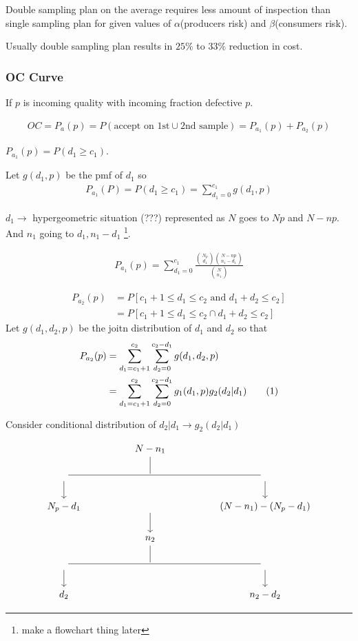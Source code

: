 \documentclass[oneside,11pt,pdftex]{book}%
\numberwithin{equation}{section}
\newcommand\numberthis{\addtocounter{equation}{1}\tag{\theequation}}
\numberwithin{section}{chapter}
\numberwithin{equation}{chapter}
\begin{document}
Double sampling plan on the average requires less amount of inspection than single sampling plan for given values of $ \alpha $(producers risk) and $ \beta  $(consumers risk).

Usually double sampling plan results in $ 25\% $ to $ 33\% $ reduction in cost.

\subsubsection{OC Curve}
If $ p $ is incoming quality with incoming fraction defective $ p $. 

\begin{align}
	OC=P_a(p) = P(\text{accept on 1st} \cup \text{2nd sample})=P_{a_1}(p)+P_{a_2}(p)
\end{align}

$ P_{a_1}(p)=P(d_1\geq c_1) $. 

Let $ g(d_1,p) $ be the pmf of $ d_1 $ so  
\begin{align}
	P_{a_1} (P)=P(d_1\geq c_1)=\sum_{d_1=0}^{c_1}g(d_1,p)
\end{align}

$ d_1 \rightarrow  $ hypergeometric situation (???) represented as $ N $ goes to $ Np $ and $ N-np $. And $ n_1 $ going to $ d_1, n_1-d_1 $ \footnote{make a flowchart thing later}.

\begin{align} 
	P_{a_1} (p)= \sum_{d_1=0}^{c_1} \frac{\binom{N_p}{d_1}\binom{N-np}{n_1-d_1}}{\binom{N}{n_1}}
\end{align}

\begin{align*}
	P_{a_2}(p)&=P[c_1+1\leq d_1 \leq c_2 \text{ and } d_1+d_2 \leq c_2]\\
	&=P[c_1+1\leq d_1 \leq c_2 \cap d_1+d_2 \leq c_2]
\end{align*}
Let $ g(d_1,d_2,p) $ be the joitn distribution of $ d_1 $ and $ d_2 $ so that 
\begin{align*}
	P_{a_2}(p)&= \sum_{d_1=c_1+1}^{c_2} \sum_{d_2=0}^{c_2-d_1}g(d_1,d_2,p)\\
	&=\sum_{d_1=c_1+1}^{c_2} \sum_{d_2=0}^{c_2-d_1} g_1(d_1,p)g_2(d_2| d_1) \numberthis
\end{align*}

Consider conditional distribution of $ d_2|d_1 \to g_2(d_2|d_1)  $

\[\begin{tikzcd}
	&& {N-n_1} \\
	{} && {} && {} \\
	{N_p-d_1} && {} && {(N-n_1)-(N_p-d_1)} \\
	&& {n_2} \\
	{} && {} && {} \\
	{d_2} &&&& {n_2-d_2}
	\arrow[from=2-5, to=3-5]
	\arrow[from=2-1, to=3-1]
	\arrow[from=5-1, to=6-1]
	\arrow[no head, from=4-3, to=5-3]
	\arrow[no head, from=5-5, to=5-1]
	\arrow[from=5-5, to=6-5]
	\arrow[no head, from=1-3, to=2-3]
	\arrow[no head, from=2-1, to=2-5]
	\arrow[from=3-3, to=4-3]
\end{tikzcd}\]
\end{document}
